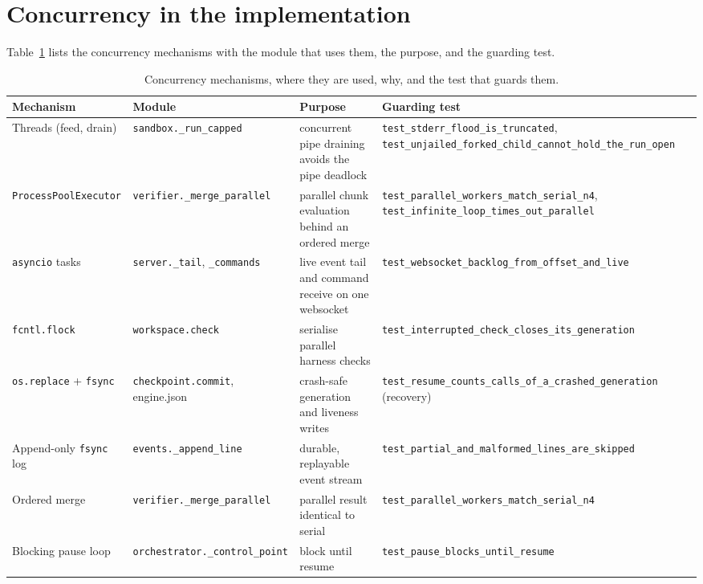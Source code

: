 \section{Concurrency in the implementation}
\label{sec:impl-concurrency}

Table~\ref{tab:impl-concurrency} lists the concurrency mechanisms with the
module that uses them, the purpose, and the guarding test.

\begin{table}[H]
\centering
\scriptsize
\setlength{\tabcolsep}{3.5pt}
\caption{Concurrency mechanisms, where they are used, why, and the test that
guards them.}
\label{tab:impl-concurrency}
\begin{tabular}{@{}p{}p{}p{}p{}@{}}
\toprule
Mechanism & Module & Purpose & Guarding test \\
\midrule
Threads (feed, drain) & \texttt{sandbox.\_run\_capped} & concurrent pipe
draining avoids the pipe deadlock & \texttt{test\_stderr\_flood\_is\_truncated},
\texttt{test\_unjailed\_forked\_child\_cannot\_hold\_the\_run\_open} \\
\texttt{ProcessPoolExecutor} & \texttt{verifier.\_merge\_parallel} & parallel
chunk evaluation behind an ordered merge &
\texttt{test\_parallel\_workers\_match\_serial\_n4},
\texttt{test\_infinite\_loop\_times\_out\_parallel} \\
\texttt{asyncio} tasks & \texttt{server.\_tail}, \texttt{\_commands} & live
event tail and command receive on one websocket &
\texttt{test\_websocket\_backlog\_from\_offset\_and\_live} \\
\texttt{fcntl.flock} & \texttt{workspace.check} & serialise parallel harness checks &
\texttt{test\_interrupted\_check\_closes\_its\_generation} \\
\texttt{os.replace} + \texttt{fsync} & \texttt{checkpoint.commit}, engine.json &
crash-safe generation and liveness writes &
\texttt{test\_resume\_counts\_calls\_of\_a\_crashed\_generation} (recovery) \\
Append-only \texttt{fsync} log & \texttt{events.\_append\_line} & durable,
replayable event stream & \texttt{test\_partial\_and\_malformed\_lines\_are\_skipped} \\
Ordered merge & \texttt{verifier.\_merge\_parallel} & parallel result identical
to serial & \texttt{test\_parallel\_workers\_match\_serial\_n4} \\
Blocking pause loop & \texttt{orchestrator.\_control\_point} & block until
resume & \texttt{test\_pause\_blocks\_until\_resume} \\
\bottomrule
\end{tabular}
\end{table}

